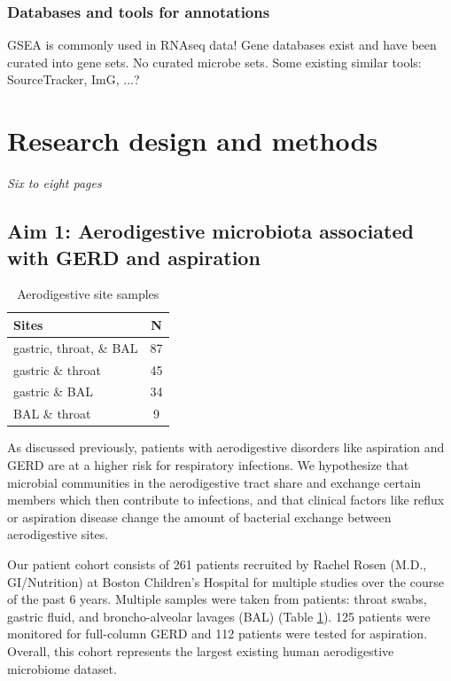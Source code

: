 \documentclass[12pt]{article}
\begin{document}
\subsubsection{Databases and tools for annotations}
GSEA is commonly used in RNAseq data! Gene databases exist and have been curated into gene sets.
No curated microbe sets. Some existing similar tools: SourceTracker, ImG, ...?

\section{Research design and methods}
\textit{Six to eight pages}

\subsection{Aim 1: Aerodigestive microbiota associated with GERD and aspiration}

\begin{table}
\begin{tabular}{|l|c|}
	\hline
	\textbf{Sites} & \textbf{N} \\
	\hline
	gastric, throat, \& BAL & 87 \\
	gastric \& throat & 45 \\
	gastric \& BAL & 34 \\
	BAL \& throat & 9 \\
	\hline 
\end{tabular}
\caption{Aerodigestive site samples}\label{tab:rosen_samples}
\end{table}

As discussed previously, patients with aerodigestive disorders like aspiration and GERD are at a higher risk for respiratory infections. We hypothesize that microbial communities in the aerodigestive tract share and exchange certain members which then contribute to infections, and that clinical factors like reflux or aspiration disease change the amount of bacterial exchange between aerodigestive sites.

Our patient cohort consists of 261 patients recruited by Rachel Rosen (M.D., GI/Nutrition) at Boston Children's Hospital for multiple studies over the course of the past 6 years. Multiple samples were taken from patients: throat swabs, gastric fluid, and broncho-alveolar lavages (BAL) (Table \ref{tab:rosen_samples}). 125 patients were monitored for full-column GERD and 112 patients were tested for aspiration. Overall, this cohort represents the largest existing human aerodigestive microbiome dataset.
\end{document}

